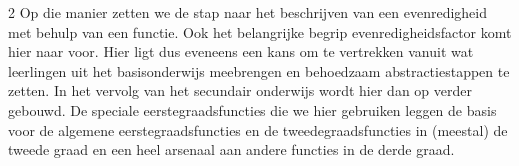 \begin{multicols}{2}
Op die manier zetten we de stap naar het beschrijven van een evenredigheid met behulp van een functie.
Ook het belangrijke begrip evenredigheidsfactor komt hier naar voor.
Hier ligt dus eveneens een kans om te vertrekken vanuit wat leerlingen uit het basisonderwijs meebrengen en behoedzaam abstractiestappen te zetten.
In het vervolg van het secundair onderwijs wordt hier dan op verder gebouwd.
De speciale eerstegraadsfuncties die we hier gebruiken leggen de basis voor de algemene eerstegraadsfuncties en de tweedegraadsfuncties in (meestal) de tweede graad en een heel arsenaal aan andere functies in de derde graad.


\end{multicols}

